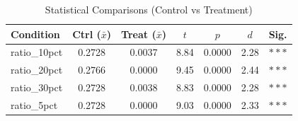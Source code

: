 \begin{table}[htbp]
\centering
\caption{Statistical Comparisons (Control vs Treatment)}
\label{tab:stats}
\begin{tabular}{lcccccc}
\toprule
Condition & Ctrl ($\bar{x}$) & Treat ($\bar{x}$) & $t$ & $p$ & $d$ & Sig. \\
\midrule
  ratio\_10pct & 0.2728 & 0.0037 & 8.84 & 0.0000 & 2.28 & $***$ \\
  ratio\_20pct & 0.2766 & 0.0000 & 9.45 & 0.0000 & 2.44 & $***$ \\
  ratio\_30pct & 0.2728 & 0.0038 & 8.83 & 0.0000 & 2.28 & $***$ \\
  ratio\_5pct & 0.2728 & 0.0000 & 9.03 & 0.0000 & 2.33 & $***$ \\
\bottomrule
\end{tabular}
\end{table}